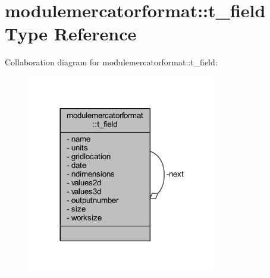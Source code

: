 \hypertarget{structmodulemercatorformat_1_1t__field}{}\section{modulemercatorformat\+:\+:t\+\_\+field Type Reference}
\label{structmodulemercatorformat_1_1t__field}


Collaboration diagram for modulemercatorformat\+:\+:t\+\_\+field\+:\nopagebreak
\begin{figure}[H]
\begin{center}
\leavevmode
\includegraphics[width=236pt]{structmodulemercatorformat_1_1t__field__coll__graph}
\end{center}
\end{figure}
